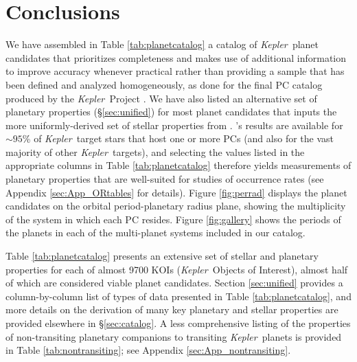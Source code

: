 \documentclass{aastex62}
\newcommand{\ik}{{\it Kepler~}}
\begin{document}
\pagebreak

\section{Conclusions} \label{sec:conclusions}

We have assembled in Table \ref{tab:planetcatalog} a catalog of \ik planet candidates that prioritizes completeness %
and makes use of additional information to improve accuracy whenever practical rather than providing a sample that has been defined and analyzed homogeneously, as done for the final PC catalog produced by the \ik Project \citep{Thompson:2018}. We have also listed an alternative set of planetary properties  (\S\ref{sec:unified}) for most planet candidates that inputs the more uniformly-derived set of stellar properties from \cite{Berger:2020a}.  \cite{Berger:2020a}'s results are available for $\sim 95$\% of \ik target stars that host one or more PCs {(and also for the vast majority of other \ik targets)}, and selecting the values listed in the appropriate columns in Table \ref{tab:planetcatalog} therefore yields measurements of planetary properties that are well-suited for studies of occurrence rates (see Appendix \ref{sec:App_ORtables} for details). {Figure \ref{fig:perrad} displays the planet candidates on the orbital period-planetary radius plane, showing the multiplicity of the system in which each PC resides. Figure \ref{fig:gallery} shows the periods of the planets in each of the multi-planet systems included in our catalog.}

Table \ref{tab:planetcatalog} presents an extensive set of stellar and planetary properties for each of almost 9700 KOIs (\ik Objects of Interest), almost half of which are considered viable planet candidates. Section \ref{sec:unified} provides a column-by-column list of types of data presented in Table \ref{tab:planetcatalog}, and more details on the derivation of many key planetary and stellar properties are provided elsewhere in \S\ref{sec:catalog}. 
A less comprehensive listing of the properties of %
non-transiting planetary companions to transiting \ik planets is provided in Table %
\ref{tab:nontransiting}; see Appendix \ref{sec:App_nontransiting}.%
\end{document}
